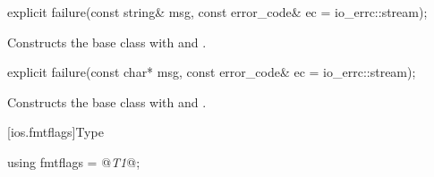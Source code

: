 \begin{indexed}{}
\begin{itemdecl}
explicit failure(const string& msg, const error_code& ec = io_errc::stream);
\end{itemdecl}
\end{indexed}

\begin{itemdescr}
\pnum
\effects
Constructs the base class with  and .
\end{itemdescr}

%
\begin{itemdecl}
explicit failure(const char* msg, const error_code& ec = io_errc::stream);
\end{itemdecl}

\begin{itemdescr}
\pnum
\effects
Constructs the base class with  and .
\end{itemdescr}

[ios.fmtflags]{Type }

%
\begin{itemdecl}
using fmtflags = @\textit{T1}@;
\end{itemdecl}

